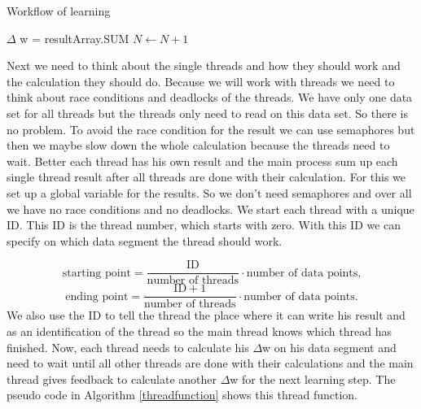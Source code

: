 \begin{text}
    \begin{algorithm} \caption{Workflow of learning}
        \label{workflow}
    	\begin{algorithmic}[1]
    	    \State
    	    \EndFor
    	    \State
                 
            	\State
        	         
        	        \EndIf
        	    \EndWhile
        	    \State
        	    \State $\Delta$ w = resultArray.SUM
        	    \State
        	    \State
        	    \State $N \gets N + 1$
        	\EndWhile
    	\end{algorithmic}
    \end{algorithm}
    
    \indent Next we need to think about the single threads and how they should work and the calculation they should do. Because we will work with threads we need to think about race conditions and deadlocks of the threads. We have only one data set for all threads but the threads only need to read on this data set. So there is no problem. To avoid the race condition for the result we can use semaphores but then we maybe slow down the whole calculation because the threads need to wait. Better each thread has his own result and the main process sum up each single thread result after all threads are done with their calculation. For this we set up a global variable for the results. So we don't need semaphores and over all we have no race conditions and no deadlocks. We start each thread with a unique ID. This ID is the thread number, which starts with zero. With this ID we can specify on which data segment the thread should work.
    
    $$\text{starting point} = \frac{\text{ID}}{\text{number of threads}} \cdot \text{number of data points,}$$
    \newline
    $$\text{ending point} = \frac{\text{ID}+1}{\text{number of threads}} \cdot \text{number of data points.}$$
    \newline 
    \noindent We also use the ID to tell the thread the place where it can write his result and as an identification of the thread so the main thread knows which thread has finished. \newline
    \noindent Now, each thread needs to calculate his $\Delta$w on his data segment and need to wait until all other threads are done with their calculations and the main thread gives feedback to calculate another $\Delta$w for the next learning step. The pseudo code in Algorithm \ref{threadfunction} shows this thread function. \newline
    

\end{text}

